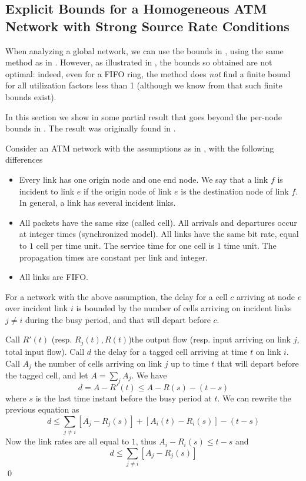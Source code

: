 \subsection{Explicit Bounds for a Homogeneous ATM Network with Strong
Source Rate Conditions} 

When analyzing a global network, we can use the bounds in
, using the same method as in
. However, as illustrated in
\cite{LeBoudec2000mMay}, the bounds so obtained are not
optimal: indeed, even for a FIFO ring, the method does
\emph{not} find a finite bound for all utilization factors
less than 1 (although we know from 
that such finite bounds exist).

In this section we show in  some partial
result that goes beyond the per-node bounds in
. The result was originally found in
\cite{CFZF98,leb99,zhang99}.

Consider an ATM network with the assumptions as in , with the following
differences
\begin{itemize}

\item  Every link has one origin node and one end node. We say
that a link $f$ is incident to link $e$ if the origin node of link
$e$ is the destination node of link $f$. In general, a link has
several incident links.
  \item All packets have the same size (called cell). All arrivals
  and departures occur at integer times (synchronized model).
All links have the same bit rate, equal to $1$ cell per
  time unit. The service time for one cell is $1$ time unit. The propagation times are
  constant per link and integer.
  \item All links are FIFO.
\end{itemize}

\begin{proposition}
 For a network with the above assumption,
the delay for a cell $c$ arriving at node $e$ over incident link
$i$ is bounded by the number of cells arriving on incident links
$j \neq i$ during the busy period, and that will depart before
$c$.
\end{proposition}
\pr
Call $R'(t)$ (resp. $R_j(t), R(t)$)the output flow (resp. input
arriving on link $j$, total input flow). Call $d$ the delay for a
tagged cell arriving at time $t$ on link $i$. Call $A_j$ the
number of cells arriving on link $j$ up to time $t$ that will
depart before the tagged cell, and let $A=\sum_j A_j$. We have
$$
 d = A - R'(t) \leq A - R(s) - (t-s)
$$
where $s$ is the last time instant before the busy period at $t$.
We can rewrite the previous equation as
$$d\leq \sum_{j \neq i}[A_j-R_j(s)] +  [A_i(t)-R_i(s)] - (t-s)
$$
Now the link rates are all equal to $1$, thus $A_i -R_i(s) \leq
t-s$ and
$$
 d \leq \sum_{j \neq i}[A_j-R_j(s)]
$$
 \qed

